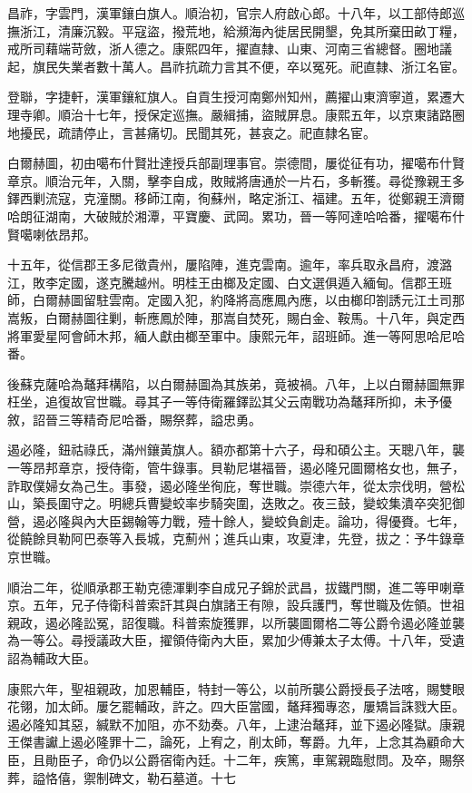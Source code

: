 \begin{pinyinscope}
昌祚，字雲門，漢軍鑲白旗人。順治初，官宗人府啟心郎。十八年，以工部侍郎巡撫浙江，清廉沉毅。平寇盜，撥荒地，給瀕海內徙居民開墾，免其所棄田畝丁糧，戒所司藉端苛斂，浙人德之。康熙四年，擢直隸、山東、河南三省總督。圈地議起，旗民失業者數十萬人。昌祚抗疏力言其不便，卒以冤死。祀直隸、浙江名宦。

登聯，字捷軒，漢軍鑲紅旗人。自貢生授河南鄭州知州，薦擢山東濟寧道，累遷大理寺卿。順治十七年，授保定巡撫。嚴緝捕，盜賊屏息。康熙五年，以京東諸路圈地擾民，疏請停止，言甚痛切。民聞其死，甚哀之。祀直隸名宦。

白爾赫圖，初由噶布什賢壯達授兵部副理事官。崇德間，屢從征有功，擢噶布什賢章京。順治元年，入關，擊李自成，敗賊將唐通於一片石，多斬獲。尋從豫親王多鐸西剿流寇，克潼關。移師江南，徇蘇州，略定浙江、福建。五年，從鄭親王濟爾哈朗征湖南，大破賊於湘潭，平寶慶、武岡。累功，晉一等阿達哈哈番，擢噶布什賢噶喇依昂邦。

十五年，從信郡王多尼徵貴州，屢陷陣，進克雲南。逾年，率兵取永昌府，渡潞江，敗李定國，遂克騰越州。明桂王由榔及定國、白文選俱遁入緬甸。信郡王班師，白爾赫圖留駐雲南。定國入犯，約降將高應鳳內應，以由榔印劄誘元江土司那嵩叛，白爾赫圖往剿，斬應鳳於陣，那嵩自焚死，賜白金、鞍馬。十八年，與定西將軍愛星阿會師木邦，緬人獻由榔至軍中。康熙元年，詔班師。進一等阿思哈尼哈番。

後蘇克薩哈為鼇拜構陷，以白爾赫圖為其族弟，竟被禍。八年，上以白爾赫圖無罪枉坐，追復故官世職。尋其子一等侍衛羅鐸訟其父云南戰功為鼇拜所抑，未予優敘，詔晉三等精奇尼哈番，賜祭葬，謚忠勇。

遏必隆，鈕祜祿氏，滿州鑲黃旗人。額亦都第十六子，母和碩公主。天聰八年，襲一等昂邦章京，授侍衛，管牛錄事。貝勒尼堪福晉，遏必隆兄圖爾格女也，無子，詐取僕婦女為己生。事發，遏必隆坐徇庇，奪世職。崇德六年，從太宗伐明，營松山，築長圍守之。明總兵曹變蛟率步騎突圍，迭敗之。夜三鼓，變蛟集潰卒突犯御營，遏必隆與內大臣錫翰等力戰，殪十餘人，變蛟負創走。論功，得優賚。七年，從饒餘貝勒阿巴泰等入長城，克薊州；進兵山東，攻夏津，先登，拔之：予牛錄章京世職。

順治二年，從順承郡王勒克德渾剿李自成兄子錦於武昌，拔鐵門關，進二等甲喇章京。五年，兄子侍衛科普索訐其與白旗諸王有隙，設兵護門，奪世職及佐領。世祖親政，遏必隆訟冤，詔復職。科普索旋獲罪，以所襲圖爾格二等公爵令遏必隆並襲為一等公。尋授議政大臣，擢領侍衛內大臣，累加少傅兼太子太傅。十八年，受遺詔為輔政大臣。

康熙六年，聖祖親政，加恩輔臣，特封一等公，以前所襲公爵授長子法喀，賜雙眼花翎，加太師。屢乞罷輔政，許之。四大臣當國，鼇拜獨專恣，屢矯旨誅戮大臣。遏必隆知其惡，緘默不加阻，亦不劾奏。八年，上逮治鼇拜，並下遏必隆獄。康親王傑書讞上遏必隆罪十二，論死，上宥之，削太師，奪爵。九年，上念其為顧命大臣，且勛臣子，命仍以公爵宿衛內廷。十二年，疾篤，車駕親臨慰問。及卒，賜祭葬，謚恪僖，禦制碑文，勒石墓道。十七


\end{pinyinscope}
